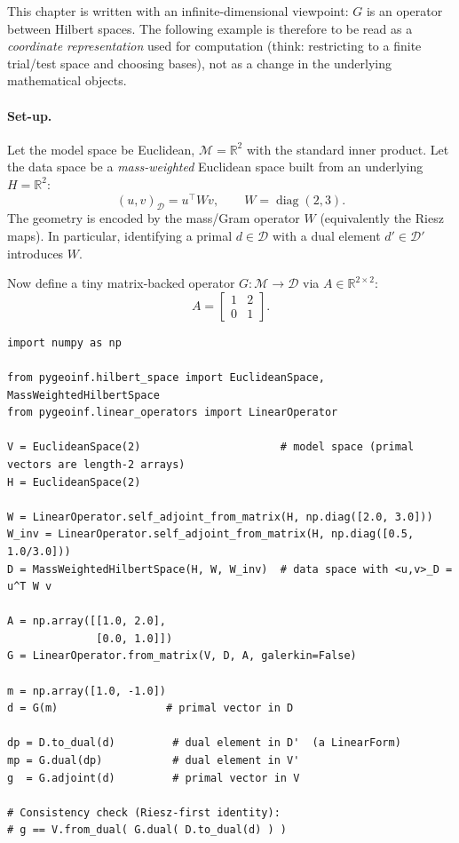 \documentclass[11pt,twoside,openright]{book}
\theoremstyle{plain}
\theoremstyle{definition}
\theoremstyle{remark}
\newcommand{\modelspace}{\mathcal{M}}
\newcommand{\dataspace}{\mathcal{D}}
\newcommand{\ipD}[2]{(#1,#2)_{\dataspace}}
\DeclareMathOperator{\diag}{diag}
\begin{document}
This chapter is written with an infinite-dimensional viewpoint: $G$ is an
operator between Hilbert spaces. The following example is therefore to be read
as a \emph{coordinate representation} used for computation (think: restricting
to a finite trial/test space and choosing bases), not as a change in the
underlying mathematical objects.

\paragraph{Set-up.}
Let the model space be Euclidean,
\(\modelspace = \mathbb{R}^2\) with the standard inner product.
Let the data space be a \emph{mass-weighted} Euclidean space built from an
underlying $H=\mathbb{R}^2$:
\begin{equation}
  \ipD{u}{v} = u^\top W v,
  \qquad
  W = \diag(2,3).
\end{equation}
The geometry is encoded by the mass/Gram operator $W$ (equivalently the Riesz
maps). In particular, identifying a primal $d\in\dataspace$ with a dual element
$d'\in\dataspace'$ introduces $W$.

Now define a tiny matrix-backed operator $G:\modelspace\to\dataspace$ via
\(A\in\mathbb{R}^{2\times 2}\):
\begin{equation}
  A = \begin{bmatrix} 1 & 2 \\ 0 & 1 \end{bmatrix}.
\end{equation}

\begin{lstlisting}
import numpy as np

from pygeoinf.hilbert_space import EuclideanSpace, MassWeightedHilbertSpace
from pygeoinf.linear_operators import LinearOperator

V = EuclideanSpace(2)                      # model space (primal vectors are length-2 arrays)
H = EuclideanSpace(2)

W = LinearOperator.self_adjoint_from_matrix(H, np.diag([2.0, 3.0]))
W_inv = LinearOperator.self_adjoint_from_matrix(H, np.diag([0.5, 1.0/3.0]))
D = MassWeightedHilbertSpace(H, W, W_inv)  # data space with <u,v>_D = u^T W v

A = np.array([[1.0, 2.0],
              [0.0, 1.0]])
G = LinearOperator.from_matrix(V, D, A, galerkin=False)

m = np.array([1.0, -1.0])
d = G(m)                 # primal vector in D

dp = D.to_dual(d)         # dual element in D'  (a LinearForm)
mp = G.dual(dp)           # dual element in V'
g  = G.adjoint(d)         # primal vector in V

# Consistency check (Riesz-first identity):
# g == V.from_dual( G.dual( D.to_dual(d) ) )
\end{lstlisting}
\end{document}
